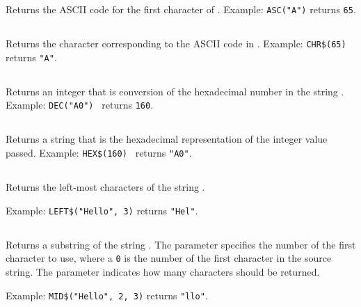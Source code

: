 \documentclass{report}
\begin{document}
    Returns the ASCII code for the first character of .
    Example: \verb+ASC("A")+ returns \verb+65+.

    \subsection*{}

    Returns the character corresponding to the ASCII code in .
    Example: \verb+CHR$(65)+ returns \verb+"A"+.   

    \subsection*{}

    Returns an integer that is conversion of the hexadecimal number in the string .
    Example: \verb+DEC("A0") + returns \verb+160+.

    \subsection*{}

    Returns a string that is the hexadecimal representation of the integer value passed.
    Example: \verb+HEX$(160) + returns \verb+"A0"+.

    \subsection*{}

    Returns the left-most  characters of the string .

    Example: \verb+LEFT$("Hello", 3)+ returns \verb+"Hel"+.   

    \subsection*{}

    Returns a substring of the string .
    The parameter  specifies the number of the first character to use, where
    a \verb+0+ is the number of the first character in the source string.
    The parameter  indicates how many characters should be returned.

    Example: \verb+MID$("Hello", 2, 3)+ returns \verb+"llo"+.
\end{document}
